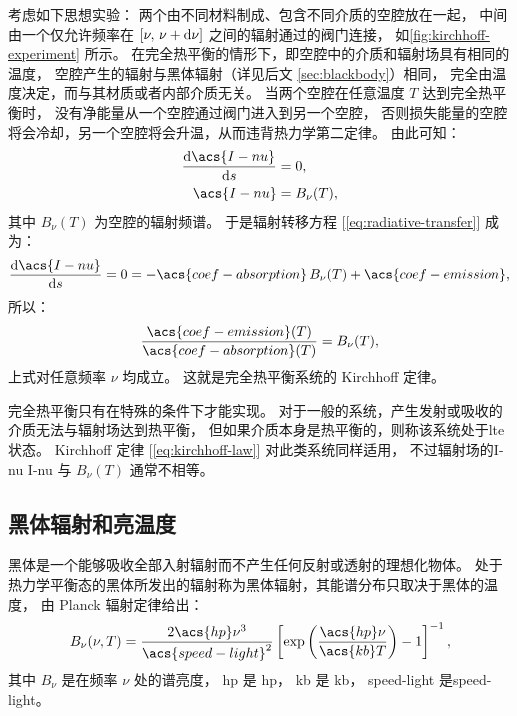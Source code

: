 考虑如下思想实验：
两个由不同材料制成、包含不同介质的空腔放在一起，
中间由一个仅允许频率在 $[\nu, \,\nu+\mathrm{d}\nu]$ 之间的辐射通过的阀门连接，
如\autoref{fig:kirchhoff-experiment} 所示。
在完全热平衡的情形下，即空腔中的介质和辐射场具有相同的温度，
空腔产生的辐射与黑体辐射（详见后文 \autoref{sec:blackbody}）相同，
完全由温度决定，而与其材质或者内部介质无关。
当两个空腔在任意温度 $T$ 达到完全热平衡时，
没有净能量从一个空腔通过阀门进入到另一个空腔，
否则损失能量的空腔将会冷却，另一个空腔将会升温，从而违背热力学第二定律。
由此可知：
\begin{align}
  \diff{\acs{I-nu}}{s} & = 0 , \\
  \acs{I-nu} & = B_{\nu}(T) ,
\end{align}
其中 $B_{\nu}(T)$ 为空腔的辐射频谱。
于是辐射转移方程 [\autoref{eq:radiative-transfer}] 成为：
\begin{equation}
  \diff{\acs{I-nu}}{s} = 0
    = - \acs{coef-absorption} \,B_{\nu}(T) + \acs{coef-emission} ,
\end{equation}
所以：
\begin{equation}
  \label{eq:kirchhoff-law}
  \frac{\acs{coef-emission}(T)}{\acs{coef-absorption}(T)} = B_{\nu}(T) ,
\end{equation}
上式对任意频率 $\nu$ 均成立。
这就是完全热平衡系统的 Kirchhoff 定律。

完全热平衡只有在特殊的条件下才能实现。
对于一般的系统，产生发射或吸收的介质无法与辐射场达到热平衡，
但如果介质本身是热平衡的，则称该系统处于\acf{lte}状态。
Kirchhoff 定律 [\autoref{eq:kirchhoff-law}] 对此类系统同样适用，
不过辐射场的\acl{I-nu} \ac{I-nu} 与 $B_{\nu}(T)$ 通常不相等。

\subsection{黑体辐射和亮温度}
\label{sec:blackbody}

黑体是一个能够吸收全部入射辐射而不产生任何反射或透射的理想化物体。
处于热力学平衡态的黑体所发出的辐射称为黑体辐射，其能谱分布只取决于黑体的温度，
由 Planck 辐射定律给出：
\begin{equation}
  \label{eq:planck}
  B_{\nu}(\nu, T) = \frac{2 \acs{hp} \nu^3}{\acs{speed-light}^2}
    \left[ \exp\left( \frac{\acs{hp} \nu}{\acs{kb} T} \right) - 1 \right]^{-1} ,
\end{equation}
其中 $B_{\nu}$ 是在频率 $\nu$ 处的谱亮度，
\acs{hp} 是 \acl{hp}，
\acs{kb} 是 \acl{kb}，
\acs{speed-light} 是\acl{speed-light}。

